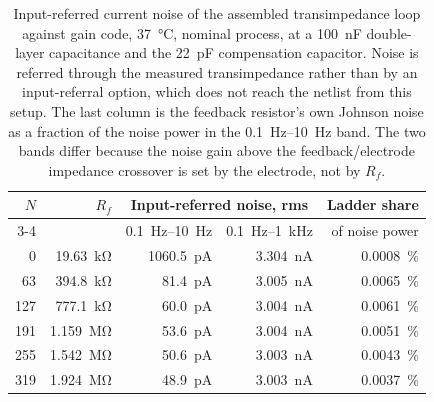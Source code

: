 \begin{table}[htbp]
  \centering
  \caption[{Input-referred current noise of the assembled transimpedance loop against gain code.}]{Input-referred current noise of the assembled transimpedance loop against gain code, \SI{37}{\celsius}, nominal process, at a \SI{100}{\nano\farad} double-layer capacitance and the \SI{22}{\pico\farad} compensation capacitor. Noise is referred through the measured transimpedance rather than by an input-referral option, which does not reach the netlist from this setup. The last column is the feedback resistor's own Johnson noise as a fraction of the noise power in the \SIrange{0.1}{10}{\hertz} band. The two bands differ because the noise gain above the feedback/electrode impedance crossover is set by the electrode, not by \(R_f\).}
  \label{tab:tiarprog-noise}
  \begin{tabular}{rrrrr}
    \toprule
    $N$ & $R_f$ & \multicolumn{2}{c}{Input-referred noise, rms} & Ladder share \\
    \cmidrule(lr){3-4}
     & & \SIrange{0.1}{10}{\hertz} & \SI{0.1}{\hertz}--\SI{1}{\kilo\hertz} & of noise power \\
    \midrule
    0   & \SI{19.63}{\kilo\ohm} & \SI{1060.5}{\pico\ampere} & \SI{3.304}{\nano\ampere} & \SI{0.0008}{\percent} \\
    63  & \SI{394.8}{\kilo\ohm} & \SI{81.4}{\pico\ampere}   & \SI{3.005}{\nano\ampere} & \SI{0.0065}{\percent} \\
    127 & \SI{777.1}{\kilo\ohm} & \SI{60.0}{\pico\ampere}   & \SI{3.004}{\nano\ampere} & \SI{0.0061}{\percent} \\
    191 & \SI{1.159}{\mega\ohm} & \SI{53.6}{\pico\ampere}   & \SI{3.004}{\nano\ampere} & \SI{0.0051}{\percent} \\
    255 & \SI{1.542}{\mega\ohm} & \SI{50.6}{\pico\ampere}   & \SI{3.003}{\nano\ampere} & \SI{0.0043}{\percent} \\
    319 & \SI{1.924}{\mega\ohm} & \SI{48.9}{\pico\ampere}   & \SI{3.003}{\nano\ampere} & \SI{0.0037}{\percent} \\
    \bottomrule
  \end{tabular}
\end{table}

